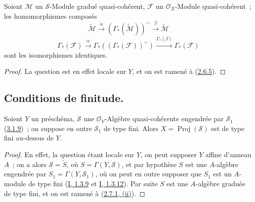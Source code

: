 \begin{proposition}[3.3.5]
\label{II.3.3.5-fr}
Soient $\mathcal{M}$ un $\mathcal{S}$-Module gradué quasi-cohérent,
$\mathcal{F}$ un $\mathcal{O}_X$-Module quasi-cohérent~; les homomorphismes
composés
\[
\label{II.3.3.5.1-fr}
  \widetilde{\mathcal{M}}
  \xrightarrow{\widetilde{\alpha}}
  (\Gamma_*(\widetilde{\mathcal{M}}))^{\sim}
  \xrightarrow{\beta}\widetilde{\mathcal{M}}
\tag{3.3.5.1}
\]
\[
\label{II.3.3.5.2-fr}
  \Gamma_*(\mathcal{F})\xrightarrow{\alpha}
  \Gamma_*((\Gamma_*(\mathcal{F}))^{\sim})
  \xrightarrow{\Gamma_*(\beta)}\Gamma_*(\mathcal{F})
\tag{3.3.5.2}
\]
sont les isomorphismes identiques.
\end{proposition}

\begin{proof}
La question est en effet locale sur $Y$, et on est ramené à
(\hyperref[II.2.6.5-fr]{2.6.5}).
\end{proof}

\subsection{Conditions de finitude.}
\label{subsection:II.3.4-fr}


\begin{proposition}[3.4.1]
\label{II.3.4.1-fr}
Soient $Y$ un préschéma, $\mathcal{S}$ une $\mathcal{O}_Y$-Algèbre
quasi-cohérente engendrée par $\mathcal{S}_1$
(\hyperref[II.3.1.9-fr]{3.1.9})~; on suppose en outre $\mathcal{S}_1$ de type
fini. Alors $X=\operatorname{Proj}(\mathcal{S})$ est de type fini au-dessus de
$Y$.
\end{proposition}

\begin{proof}
En effet, la question étant locale sur $Y$, on peut supposer $Y$ affine
d'anneau $A$~; on a alors $\mathcal{S}=\widetilde{S}$, où
$S=\Gamma(Y,\mathcal{S})$, et par hypothèse $S$ est une $A$-algèbre engendrée
par $S_1=\Gamma(Y,\mathcal{S}_1)$, où on peut en outre supposer que $S_1$ est
un $A$-module de type fini
(\hyperref[I.1.3.9-fr]{I, 1.3.9} et
\hyperref[I.1.3.12-fr]{I, 1.3.12}). Par suite $S$ est une $A$-algèbre graduée
de type fini, et on est ramené à
(\hyperref[II.2.7.1-fr]{2.7.1, (ii)}).
\end{proof}

